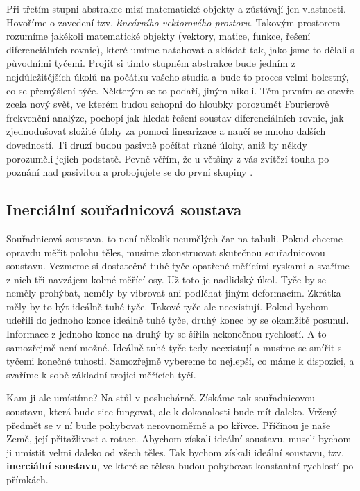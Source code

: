       Při třetím stupni abstrakce mizí matematické objekty a zůstávají jen vlastnosti. Hovoříme o
      zavedení tzv. \emph{lineárního vektorového prostoru}. Takovým prostorem rozumíme jakékoli
      matematické objekty (vektory, matice, funkce, řešení diferenciálních rovnic), které umíme
      natahovat a skládat tak, jako jsme to dělali s původními tyčemi. Projít si tímto stupněm
      abstrakce bude jedním z nejdůležitějších úkolů na počátku vašeho studia a bude to proces velmi
      bolestný, co se přemýšlení týče. Některým se to podaří, jiným nikoli. Těm prvním se otevře
      zcela nový svět, ve kterém budou schopni do hloubky porozumět Fourierově frekvenční analýze,
      pochopí jak hledat řešení soustav diferenciálních rovnic, jak zjednodušovat složité úlohy za
      pomoci linearizace a naučí se mnoho dalších dovedností. Ti druzí budou pasivně počítat různé
      úlohy, aniž by někdy porozuměli jejich podstatě. Pevně věřím, že u většiny z vás zvítězí touha
      po poznání nad pasivitou a probojujete se do první skupiny \cite[s.~7]{Kulhanek2020}. 
    
    \subsection{Inerciální souřadnicová soustava}
      Souřadnicová soustava, to není několik neumělých čar na tabuli. Pokud chceme opravdu měřit
      polohu těles, musíme zkonstruovat skutečnou souřadnicovou soustavu. Vezmeme si dostatečně tuhé
      tyče opatřené měřícími ryskami a svaříme z nich tři navzájem kolmé měřící osy. Už toto je
      nadlidský úkol. Tyče by se neměly prohýbat, neměly by vibrovat ani podléhat jiným deformacím.
      Zkrátka měly by to být ideálně tuhé tyče. Takové tyče ale neexistují. Pokud bychom udeřili do
      jednoho konce ideálně tuhé tyče, druhý konec by se okamžitě posunul. Informace z jednoho konce
      na druhý by se šířila nekonečnou rychlostí. A to samozřejmě není možné. Ideálně tuhé tyče tedy
      neexistují a musíme se smířit s tyčemi konečné tuhosti. Samozřejmě vybereme to nejlepší, co
      máme k dispozici, a svaříme k sobě základní trojici měřících tyčí.

      Kam ji ale umístíme? Na stůl v posluchárně. Získáme tak souřadnicovou soustavu, která bude
      sice fungovat, ale k dokonalosti bude mít daleko. Vržený předmět se v ní bude pohybovat
      nerovnoměrně a po křivce. Příčinou je naše Země, její přitažlivost a rotace. Abychom získali
      ideální soustavu, museli bychom ji umístit velmi daleko od všech těles. Tak bychom získali
      ideální soustavu, tzv. \textbf{inerciální soustavu}, ve které se tělesa budou pohybovat
      konstantní rychlostí po přímkách.

